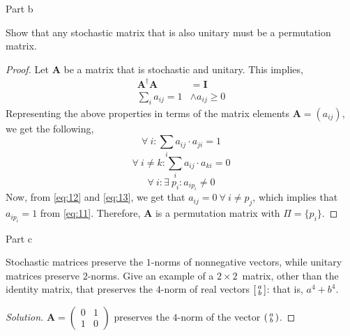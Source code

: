 \begin{solution}{Part b}\label{ques:1b}
  \begin{question}
    Show that any stochastic matrix that is also unitary must be a permutation matrix.
  \end{question}
  \tcblower{}
  \begin{proof}
    Let $\mathbf{A}$ be a matrix that is stochastic and unitary. This implies,
    \begin{equation}
      \begin{split}
        \mathbf{A}^\dag\mathbf{A} &= \mathbf{I}\\
        \sum_{i} a_{ij} = 1 &\wedge a_{ij} \geq 0
      \end{split}
    \end{equation}
    Representing the above properties in terms of the matrix elements $\mathbf{A} = (a_{ij})$, we get the following,
    \begin{equation}
      \forall\ i: \sum_{i} a_{ij}\cdot a_{ji} = 1
      \label{eq:11}
    \end{equation}
    \begin{equation}
      \forall\ i \neq k: \sum_{i} a_{ij}\cdot a_{ki} = 0
      \label{eq:12}
    \end{equation}
    \begin{equation}
      \forall\ i: \exists\ p_i: a_{ip_i} \neq 0
      \label{eq:13}
    \end{equation}
    Now, from \eqref{eq:12} and \eqref{eq:13}, we get that $a_{ij} = 0\ \forall\ i \neq p_j$, which implies that $a_{ip_i} = 1$ from \eqref{eq:11}. Therefore, $\mathbf{A}$ is a permutation matrix with $\Pi = \{p_i\}$.
  \end{proof}
\end{solution}

\begin{solution}{Part c}\label{ques:1c}
  \begin{question}
    Stochastic matrices preserve the $1$-norms of nonnegative vectors, while
unitary matrices preserve $2$-norms. Give an example of a $2\times
2$\ matrix, other than the identity matrix, that preserves the $4$-norm of
real vectors $\begin{bsmallmatrix} a\\b\end{bsmallmatrix}$: that is, $a^{4}+b^{4}$.
  \end{question}
  \tcblower{}
  \begin{proof}[Solution]
    $\mathbf{A} = \begin{pmatrix}
      0 & 1\\
      1 & 0
      \end{pmatrix}$ preserves the $4$-norm of the vector $\begin{psmallmatrix} a\\b\end{psmallmatrix}$.
  \end{proof}
\end{solution}

